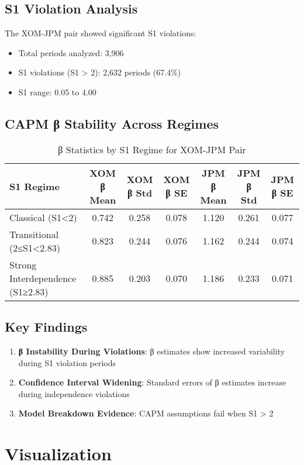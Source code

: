 \documentclass[11pt,a4paper]{article}
\begin{document}
\subsection{S1 Violation Analysis}
The XOM-JPM pair showed significant S1 violations:
\begin{itemize}
\item Total periods analyzed: 3,906
\item S1 violations (S1 > 2): 2,632 periods (67.4\%)
\item S1 range: 0.05 to 4.00
\end{itemize}

\subsection{CAPM β Stability Across Regimes}

\begin{table}[H]
\centering
\caption{β Statistics by S1 Regime for XOM-JPM Pair}
\begin{tabular}{lcccccc}
\toprule
S1 Regime & XOM β Mean & XOM β Std & XOM β SE & JPM β Mean & JPM β Std & JPM β SE \\
\midrule
Classical (S1<2) & 0.742 & 0.258 & 0.078 & 1.120 & 0.261 & 0.077 \\
Transitional (2≤S1<2.83) & 0.823 & 0.244 & 0.076 & 1.162 & 0.244 & 0.074 \\
Strong Interdependence (S1≥2.83) & 0.885 & 0.203 & 0.070 & 1.186 & 0.233 & 0.071 \\
\bottomrule
\end{tabular}
\end{table}

\subsection{Key Findings}

\begin{enumerate}
\item \textbf{β Instability During Violations}: β estimates show increased variability during S1 violation periods
\item \textbf{Confidence Interval Widening}: Standard errors of β estimates increase during independence violations
\item \textbf{Model Breakdown Evidence}: CAPM assumptions fail when S1 > 2
\end{enumerate}

\section{Visualization}
\end{document}

